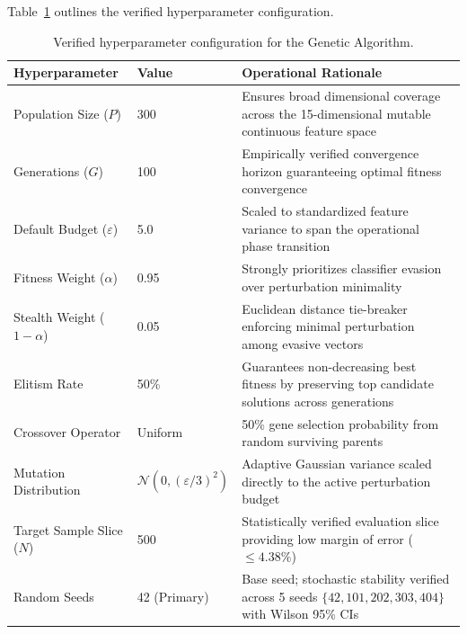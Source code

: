 \documentclass[iicol,pdflatex,sn-mathphys-num]{sn-jnl}
\begin{document}
Table~\ref{tab:ga_hyperparams} outlines the verified hyperparameter configuration.

\begin{table}[t]
\centering
\small
\caption{Verified hyperparameter configuration for the Genetic Algorithm.}
\label{tab:ga_hyperparams}
\begin{tabularx}{\textwidth}{l l X}
\toprule
\textbf{Hyperparameter} & \textbf{Value} & \textbf{Operational Rationale} \\
\midrule
Population Size ($P$) & 300 & Ensures broad dimensional coverage across the 15-dimensional mutable continuous feature space \\
Generations ($G$) & 100 & Empirically verified convergence horizon guaranteeing optimal fitness convergence \\
Default Budget ($\varepsilon$) & 5.0 & Scaled to standardized feature variance to span the operational phase transition \\
Fitness Weight ($\alpha$) & 0.95 & Strongly prioritizes classifier evasion over perturbation minimality \\
Stealth Weight ($1-\alpha$) & 0.05 & Euclidean distance tie-breaker enforcing minimal perturbation among evasive vectors \\
Elitism Rate & 50\% & Guarantees non-decreasing best fitness by preserving top candidate solutions across generations \\
Crossover Operator & Uniform & 50\% gene selection probability from random surviving parents \\
Mutation Distribution & $\mathcal{N}(0, (\varepsilon/3)^2)$ & Adaptive Gaussian variance scaled directly to the active perturbation budget \\
Target Sample Slice ($N$) & 500 & Statistically verified evaluation slice providing low margin of error ($\le 4.38\%$) \\
Random Seeds & 42 (Primary) & Base seed; stochastic stability verified across 5 seeds $\{42, 101, 202, 303, 404\}$ with Wilson 95\% CIs \\
\bottomrule
\end{tabularx}
\end{table}
\end{document}
